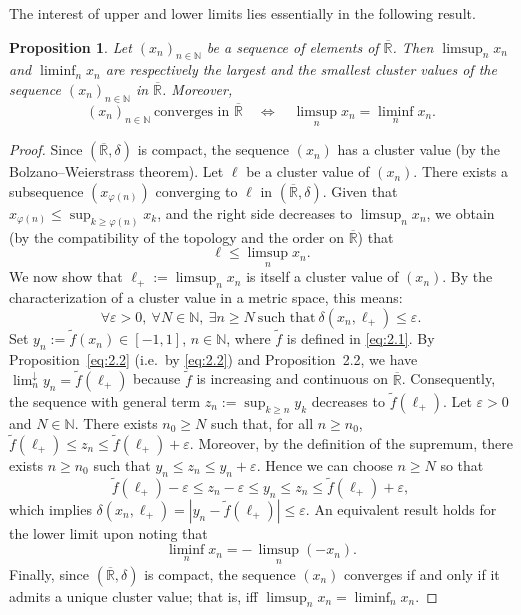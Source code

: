 \documentclass[12pt]{article}
\newtheorem{proposition}{Proposition}[section]
\theoremstyle{definition}
\begin{document}
The interest of upper and lower limits lies essentially in the following result.

\begin{proposition}
Let $(x_n)_{n\in\mathbb{N}}$ be a sequence of elements of $\overline{\mathbb{R}}$.
Then $\limsup_{n} x_n$ and $\liminf_{n} x_n$ are respectively the largest and the smallest cluster values of the sequence $(x_n)_{n\in\mathbb{N}}$ in $\overline{\mathbb{R}}$.
Moreover,
\[
(x_n)_{n\in\mathbb{N}}\ \text{converges in }\overline{\mathbb{R}}
\quad\Longleftrightarrow\quad
\limsup_{n} x_n=\liminf_{n} x_n .
\]
\end{proposition}

\begin{proof}
Since $(\overline{\mathbb{R}},\delta)$ is compact, the sequence $(x_n)$ has a cluster value (by the Bolzano--Weierstrass theorem).
Let $\ell$ be a cluster value of $(x_n)$.
There exists a subsequence $(x_{\varphi(n)})$ converging to $\ell$ in $(\overline{\mathbb{R}},\delta)$.
Given that $x_{\varphi(n)}\le \sup_{k\ge \varphi(n)} x_k$, and the right side decreases to $\limsup_{n} x_n$, we obtain (by the compatibility of the topology and the order on $\overline{\mathbb{R}}$) that
\[
\ell \le \limsup_{n} x_n.
\]
We now show that $\ell_+:=\limsup_{n} x_n$ is itself a cluster value of $(x_n)$.
By the characterization of a cluster value in a metric space, this means:
\[
\forall \varepsilon>0,\ \forall N\in\mathbb{N},\ \exists n\ge N\ \text{such that}\ \delta(x_n,\ell_+)\le \varepsilon.
\]
Set $y_n:=\tilde f(x_n)\in[-1,1]$, $n\in\mathbb{N}$, where $\tilde f$ is defined in \eqref{eq:2.1}.
By Proposition~\ref{eq:2.2} (i.e.\ by \eqref{eq:2.2}) and Proposition~2.2, we have $\lim_{n}^\downarrow y_n=\tilde f(\ell_+)$ because $\tilde f$ is increasing and continuous on $\overline{\mathbb{R}}$.
Consequently, the sequence with general term $z_n:=\sup_{k\ge n} y_k$ decreases to $\tilde f(\ell_+)$.
Let $\varepsilon>0$ and $N\in\mathbb{N}$.
There exists $n_0\ge N$ such that, for all $n\ge n_0$, $\tilde f(\ell_+)\le z_n\le \tilde f(\ell_+)+\varepsilon$.
Moreover, by the definition of the supremum, there exists $n\ge n_0$ such that $y_n\le z_n\le y_n+\varepsilon$.
Hence we can choose $n\ge N$ so that
\[
\tilde f(\ell_+) - \varepsilon \le z_n - \varepsilon \le y_n \le z_n \le \tilde f(\ell_+)+\varepsilon,
\]
which implies $\delta(x_n,\ell_+)=|y_n-\tilde f(\ell_+)|\le \varepsilon$.
An equivalent result holds for the lower limit upon noting that
\[
\liminf_{n} x_n= -\,\limsup_{n}(-x_n).
\]
Finally, since $(\overline{\mathbb{R}},\delta)$ is compact, the sequence $(x_n)$ converges if and only if it admits a unique cluster value; that is, iff $\limsup_{n} x_n=\liminf_{n} x_n$.
\end{proof}
\end{document}
